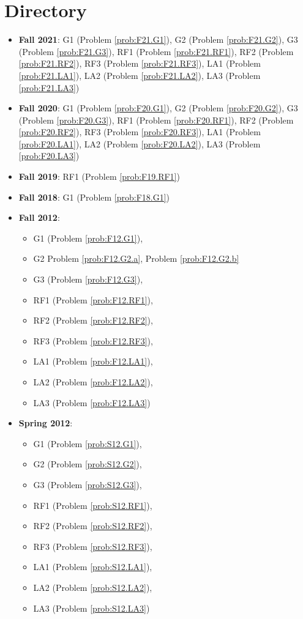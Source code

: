 \documentclass{article}
\theoremstyle{definition}
\begin{document}
\tableofcontents

\section{Directory}

\begin{itemize}
\item \textbf{Fall 2021}: 	G1 (Problem \ref{prob:F21.G1}), 
							G2 (Problem \ref{prob:F21.G2}), 
							G3 (Problem \ref{prob:F21.G3}),
							RF1 (Problem \ref{prob:F21.RF1}),
							RF2 (Problem \ref{prob:F21.RF2}),
							RF3 (Problem \ref{prob:F21.RF3}),
							LA1 (Problem \ref{prob:F21.LA1}),
							LA2 (Problem \ref{prob:F21.LA2}),
							LA3 (Problem \ref{prob:F21.LA3})
\item \textbf{Fall 2020}:  	G1 (Problem \ref{prob:F20.G1}), 
							G2 (Problem \ref{prob:F20.G2}), 
							G3 (Problem \ref{prob:F20.G3}),
							RF1 (Problem \ref{prob:F20.RF1}),
							RF2 (Problem \ref{prob:F20.RF2}),
							RF3 (Problem \ref{prob:F20.RF3}),
							LA1 (Problem \ref{prob:F20.LA1}),
							LA2 (Problem \ref{prob:F20.LA2}),
							LA3 (Problem \ref{prob:F20.LA3})
\item \textbf{Fall 2019}: RF1 (Problem \ref{prob:F19.RF1})
\item \textbf{Fall 2018}: G1 (Problem \ref{prob:F18.G1})
\item \textbf{Fall 2012}:	
	\begin{itemize}
	\item G1 (Problem \ref{prob:F12.G1}), 
	\item G2 Problem \ref{prob:F12.G2.a}, Problem \ref{prob:F12.G2.b}
	\item G3 (Problem \ref{prob:F12.G3}),
	\item RF1 (Problem \ref{prob:F12.RF1}),
	\item RF2 (Problem \ref{prob:F12.RF2}),
	\item RF3 (Problem \ref{prob:F12.RF3}),
	\item LA1 (Problem \ref{prob:F12.LA1}),
	\item LA2 (Problem \ref{prob:F12.LA2}),
	\item LA3 (Problem \ref{prob:F12.LA3})	
	\end{itemize}
\item \textbf{Spring 2012}:  
	\begin{itemize}
	\item G1 (Problem \ref{prob:S12.G1}), 
	\item G2 (Problem \ref{prob:S12.G2}), 
	\item G3 (Problem \ref{prob:S12.G3}),
	\item RF1 (Problem \ref{prob:S12.RF1}),
	\item RF2 (Problem \ref{prob:S12.RF2}),
	\item RF3 (Problem \ref{prob:S12.RF3}),
	\item LA1 (Problem \ref{prob:S12.LA1}),
	\item LA2 (Problem \ref{prob:S12.LA2}),
	\item LA3 (Problem \ref{prob:S12.LA3})	
	\end{itemize}	
	

\end{itemize}
\end{document}
